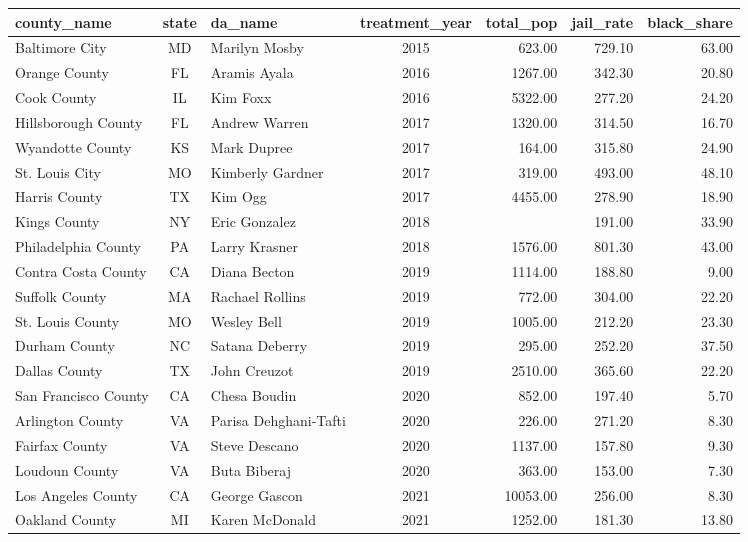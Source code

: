 \begin{table}[ht]
\centering
\begin{tabular}{lclcrrr}
  \toprule
county_name & state & da_name & treatment_year & total_pop & jail_rate & black_share \\ 
  \midrule
Baltimore City & MD & Marilyn Mosby & 2015 & 623.00 & 729.10 & 63.00 \\ 
  Orange County & FL & Aramis Ayala & 2016 & 1267.00 & 342.30 & 20.80 \\ 
  Cook County & IL & Kim Foxx & 2016 & 5322.00 & 277.20 & 24.20 \\ 
  Hillsborough County & FL & Andrew Warren & 2017 & 1320.00 & 314.50 & 16.70 \\ 
  Wyandotte County & KS & Mark Dupree & 2017 & 164.00 & 315.80 & 24.90 \\ 
  St. Louis City & MO & Kimberly Gardner & 2017 & 319.00 & 493.00 & 48.10 \\ 
  Harris County & TX & Kim Ogg & 2017 & 4455.00 & 278.90 & 18.90 \\ 
  Kings County & NY & Eric Gonzalez & 2018 &  & 191.00 & 33.90 \\ 
  Philadelphia County & PA & Larry Krasner & 2018 & 1576.00 & 801.30 & 43.00 \\ 
  Contra Costa County & CA & Diana Becton & 2019 & 1114.00 & 188.80 & 9.00 \\ 
  Suffolk County & MA & Rachael Rollins & 2019 & 772.00 & 304.00 & 22.20 \\ 
  St. Louis County & MO & Wesley Bell & 2019 & 1005.00 & 212.20 & 23.30 \\ 
  Durham County & NC & Satana Deberry & 2019 & 295.00 & 252.20 & 37.50 \\ 
  Dallas County & TX & John Creuzot & 2019 & 2510.00 & 365.60 & 22.20 \\ 
  San Francisco County & CA & Chesa Boudin & 2020 & 852.00 & 197.40 & 5.70 \\ 
  Arlington County & VA & Parisa Dehghani-Tafti & 2020 & 226.00 & 271.20 & 8.30 \\ 
  Fairfax County & VA & Steve Descano & 2020 & 1137.00 & 157.80 & 9.30 \\ 
  Loudoun County & VA & Buta Biberaj & 2020 & 363.00 & 153.00 & 7.30 \\ 
  Los Angeles County & CA & George Gascon & 2021 & 10053.00 & 256.00 & 8.30 \\ 
  Oakland County & MI & Karen McDonald & 2021 & 1252.00 & 181.30 & 13.80 \\ 

\end{tabular}
\end{table}
